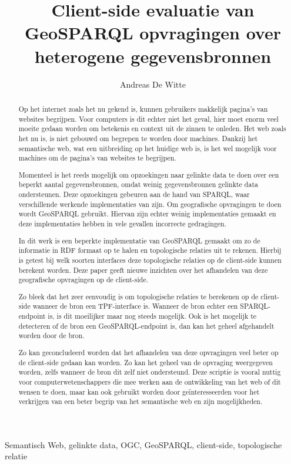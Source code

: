 \documentclass[twocolumn]{phdsymp} %
\begin{document}
\title{Client-side evaluatie van GeoSPARQL opvragingen over heterogene gegevensbronnen} %

\author{Andreas De Witte}


\maketitle

\begin{abstract}
    Op het internet zoals het nu gekend is, kunnen gebruikers makkelijk pagina's van websites begrijpen. Voor computers is dit echter niet het geval, hier moet enorm veel moeite gedaan worden om betekenis en context uit de zinnen te onleden. Het web zoals het nu is, is niet gebouwd om begrepen te worden door machines. Dankzij het semantische web, wat een uitbreiding op het huidige web is, is het wel mogelijk voor machines om de pagina's van websites te begrijpen.
    
    Momenteel is het reeds mogelijk om opzoekingen naar gelinkte data te doen over een beperkt aantal gegevensbronnen, omdat weinig gegevensbronnen gelinkte data ondersteunen. Deze opzoekingen gebeuren aan de hand van SPARQL, waar verschillende werkende implementaties van zijn. Om geografische opvragingen te doen wordt GeoSPARQL gebruikt. Hiervan zijn echter weinig implementaties gemaakt en deze implementaties hebben in vele gevallen incorrecte gedragingen.
    
    In dit werk is een beperkte implementatie van GeoSPARQL gemaakt om zo de informatie in RDF formaat op te halen en topologische relaties uit te rekenen. Hierbij is getest bij welk soorten interfaces deze topologische relaties op de client-side kunnen berekent worden. Deze paper geeft nieuwe inzichten over het afhandelen van deze geografische opvragingen op de client-side.
    
    Zo bleek dat het zeer eenvoudig is om topologische relaties te berekenen op de client-side wanneer de bron een TPF-interface is. Wanneer de bron echter een SPARQL-endpoint is, is dit moeilijker maar nog steeds mogelijk. Ook is het mogelijk te detecteren of de bron een GeoSPARQL-endpoint is, dan kan het geheel afgehandelt worden door de bron.
    
    Zo kan geconcludeerd worden dat het afhandelen van deze opvragingen veel beter op de client-side gedaan kan worden. Zo kan het geheel van de opvraging weergegeven worden, zelfs wanneer de bron dit zelf niet ondersteund. Deze scriptie is vooral nuttig voor computerwetenschappers die mee werken aan de ontwikkeling van het web of dit wensen te doen, maar kan ook gebruikt worden door geïnteresseerden voor het verkrijgen van een beter begrip van het semantische web en zijn mogelijkheden.
\end{abstract}

\begin{keywords}
    Semantisch Web, gelinkte data, OGC, GeoSPARQL, client-side, topologische relatie
\end{keywords}
\end{document}
